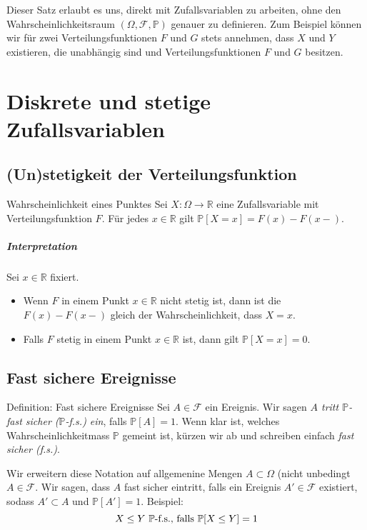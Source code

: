 \documentclass[a4paper,10pt]{article}
\def\R{\mathbb{R}}
\def\P{\mathbb{P}}
\begin{document}
Dieser Satz erlaubt es uns, direkt mit Zufallsvariablen zu arbeiten, ohne den Wahrscheinlichkeitsraum \( (\Omega, \mathcal{F}, \P) \) genauer zu definieren. Zum Beispiel können wir für zwei Verteilungsfunktionen \( F \) und \( G \) stets annehmen, dass \( X \) und \( Y \) existieren, die unabhängig sind und Verteilungsfunktionen \( F \) und \( G \) besitzen.


\section{Diskrete und stetige Zufallsvariablen}

\subsection{(Un)stetigkeit der Verteilungsfunktion}

\begin{subbox}{Wahrscheinlichkeit eines Punktes}
    Sei \( X: \Omega \to \R \) eine Zufallsvariable mit Verteilungsfunktion \( F \). Für jedes \( x \in \R \) gilt \( \P[X = x] = F(x) - F(x-) \).
\end{subbox}

\subparagraph{Interpretation} Sei \( x \in \R \) fixiert.
\begin{itemize}
    \item Wenn \( F \) in einem Punkt \( x \in \R \) nicht stetig ist, dann ist die  \( F(x) - F(x-) \) gleich der Wahrscheinlichkeit, dass \( X = x\).
    \item Falls \( F \) stetig in einem Punkt \( x \in \R \) ist, dann gilt \( \P[X = x] = 0 \).
\end{itemize}


\subsection{Fast sichere Ereignisse}

\begin{mainbox}{Definition: Fast sichere Ereignisse}
    Sei \( A \in \mathcal{F} \) ein Ereignis. Wir sagen \emph{\( A \) tritt \( \P \)-fast sicher (\( \P \)-f.s.) ein}, falls \( \P[A] = 1\). Wenn klar ist, welches Wahrscheinlichkeitmass \( \P \) gemeint ist, kürzen wir ab und schreiben einfach \emph{fast sicher (f.s.)}.
\end{mainbox}

Wir erweitern diese Notation auf allgemenine Mengen \( A \subset \Omega \) (nicht unbedingt \( A \in \mathcal{F} \). Wir sagen, dass \( A \) fast sicher eintritt, falls ein Ereignis \( A' \in \mathcal{F} \) existiert, sodass \( A' \subset A \) und \( \P[A'] = 1 \). Beispiel:
\[ X \leq Y \text{ \( \P \)-f.s., falls } \P[X \leq Y] = 1 \]
\end{document}
